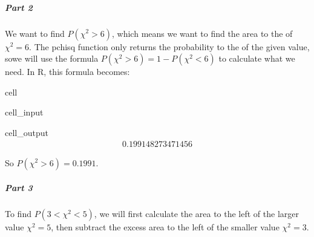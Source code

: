 \documentclass[letterpaper,10pt,english]{jupyterBook}
\begin{document}
\subparagraph{Part 2}
\label{\detokenize{Ch7 The Chi-Square Distribution/7.1 The Chi-Square Distribution:part-2}}
\sphinxAtStartPar
We want to find \(P(\chi^2 > 6)\), which means we want to find the area to the  of \(\chi^2 = 6\). The pchisq function only returns the probability to the  of the given value, sowe will use the formula \(P(\chi^2 > 6) = 1 - P(\chi^2 < 6)\) to calculate what we need. In R, this formula becomes:

\begin{sphinxuseclass}{cell}\begin{sphinxVerbatimInput}

\begin{sphinxuseclass}{cell_input}
\begin{sphinxVerbatim}[commandchars=\\\{\}]
\end{sphinxVerbatim}

\end{sphinxuseclass}\end{sphinxVerbatimInput}
\begin{sphinxVerbatimOutput}

\begin{sphinxuseclass}{cell_output}\begin{equation*}
\begin{split}0.199148273471456\end{split}
\end{equation*}
\end{sphinxuseclass}\end{sphinxVerbatimOutput}

\end{sphinxuseclass}
\sphinxAtStartPar
So \(P(\chi^2 > 6) = 0.1991\).


\subparagraph{Part 3}
\label{\detokenize{Ch7 The Chi-Square Distribution/7.1 The Chi-Square Distribution:part-3}}
\sphinxAtStartPar
To find \(P(3 < \chi^2 < 5)\), we will first calculate  the area to the left of the larger value \(\chi^2 = 5\), then subtract the excess area to the left of the smaller value \(\chi^2 = 3\).
\end{document}
